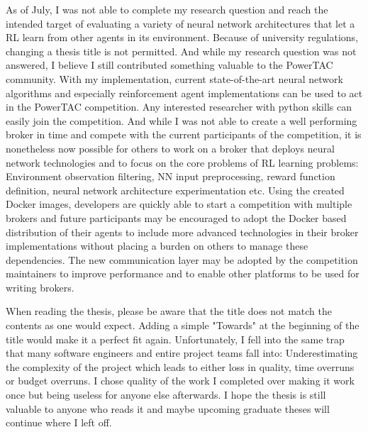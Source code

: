 As of July, I was not able to complete my research question and reach the intended target of evaluating a variety of
neural network architectures that let a RL learn from other agents in its environment. Because of university
regulations, changing a thesis title is not permitted. And while my research question was not answered, I believe I
still contributed something valuable to the PowerTAC community. With my implementation, current state-of-the-art neural
network algorithms and especially reinforcement agent implementations can be used to act in the PowerTAC competition.
Any interested researcher with python skills can easily join the competition. And while I was not able to create a well
performing broker in time and compete with the current participants of the competition, it is nonetheless now possible
for others to work on a broker that deploys neural network technologies and to focus on the core problems of RL learning
problems: Environment observation filtering, NN input preprocessing, reward function definition, neural network
architecture experimentation etc. Using the created Docker images, developers are quickly able to start a competition
with multiple brokers and future participants may be encouraged to adopt the Docker based distribution of their agents
to include more advanced technologies in their broker implementations without placing a burden on others to manage these
dependencies.  The new communication layer may be adopted by the competition maintainers to improve performance and to
enable other platforms to be used for writing brokers.   

When reading the thesis, please be aware that the title does not match the contents as one would expect. Adding a simple
"Towards" at the beginning of the title would make it a perfect fit again. Unfortunately, I fell into the same trap that
many software engineers and entire project teams fall into: Underestimating the complexity of the project which leads to
either loss in quality, time overruns or budget overruns. I chose quality of the work I completed over making it work
once but being useless for anyone else afterwards. I hope the thesis is still valuable to anyone who reads it and maybe
upcoming graduate theses will continue where I left off. 
